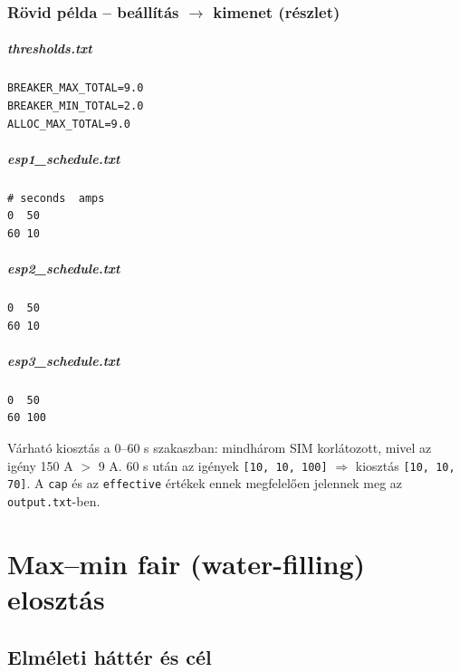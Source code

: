 \subsection{Rövid példa -- beállítás $\rightarrow$ kimenet (részlet)}

\paragraph{thresholds.txt}
\begin{verbatim}
BREAKER_MAX_TOTAL=9.0
BREAKER_MIN_TOTAL=2.0
ALLOC_MAX_TOTAL=9.0
\end{verbatim}

\paragraph{esp1\_schedule.txt}
\begin{verbatim}
# seconds  amps
0  50
60 10
\end{verbatim}

\paragraph{esp2\_schedule.txt}
\begin{verbatim}
0  50
60 10
\end{verbatim}

\paragraph{esp3\_schedule.txt}
\begin{verbatim}
0  50
60 100
\end{verbatim}

\noindent Várható kiosztás a 0--60 s szakaszban: mindhárom SIM korlátozott, 
mivel az igény 150 A $>$ 9 A. 60 s után az 
igények \texttt{[10, 10, 100]} $\Rightarrow$ kiosztás \texttt{[10, 10, 70]}. A \texttt{cap} és 
az \texttt{effective} értékek ennek megfelelően jelennek meg az \texttt{output.txt}-ben.

\chapter{Max--min fair (water-filling) elosztás}

\section{Elméleti háttér és cél}

